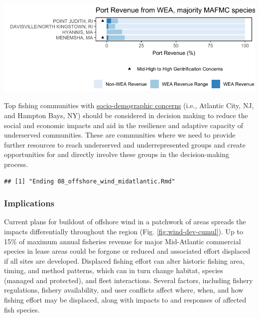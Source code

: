 \documentclass[
  10pt,
]{article}
\let\origfigure\figure
\let\endorigfigure\endfigure
\renewenvironment{figure}[1][2] {
    \expandafter\origfigure\expandafter[H]
} {
    \endorigfigure
}
\begin{document}
\begin{figure}

\includegraphics{midatlantic_files/figure-latex/wind-rev-NE-MAFMC-1} \hfill{}

\caption{Percent of New England port revenue with majority MAFMC landings from Wind Energy Areas (WEA) in descending order from most to least port revenue from WEA.}\label{fig:wind-rev-NE-MAFMC}
\end{figure}

Top fishing communities with \href{https://noaa-edab.github.io/catalog/engagement.html}{socio-demographic concerns} (i.e., Atlantic City, NJ, and Hampton Bays, NY) should be considered in decision making to reduce the social and economic impacts and aid in the resilience and adaptive capacity of underserved communities. These are communities where we need to provide further resources to reach underserved and underrepresented groups and create opportunities for and directly involve these groups in the decision-making process.

\begin{verbatim}
## [1] "Ending 08_offshore_wind_midatlantic.Rmd"
\end{verbatim}

\subsubsection{Implications}\label{implications-6}

Current plans for buildout of offshore wind in a patchwork of areas spreads the impacts differentially throughout the region (Fig. \ref{fig:wind-dev-cumul}). Up to 15\% of maximum annual fisheries revenue for major Mid-Atlantic commercial species in lease areas could be forgone or reduced and associated effort displaced if all sites are developed. Displaced fishing effort can alter historic fishing area, timing, and method patterns, which can in turn change habitat, species (managed and protected), and fleet interactions. Several factors, including fishery regulations, fishery availability, and user conflicts affect where, when, and how fishing effort may be displaced, along with impacts to and responses of affected fish species.
\end{document}
